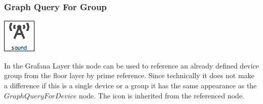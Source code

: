 \subsubsection{Graph Query For Group}
\noindent\begin{minipage}{0.15\textwidth}%
\includegraphics[width=\linewidth]{assets/images/group2}
\end{minipage}%
\hfill%
\begin{minipage}{0.8\textwidth}
In the Grafana Layer this node can be used to reference an already defined device group from the floor layer by prime reference. Since technically it does not make a difference if this is a single device or a group it has the same appearance as the $GraphQueryForDevice$ node. The icon is inherited from the referenced node.
\end{minipage}


